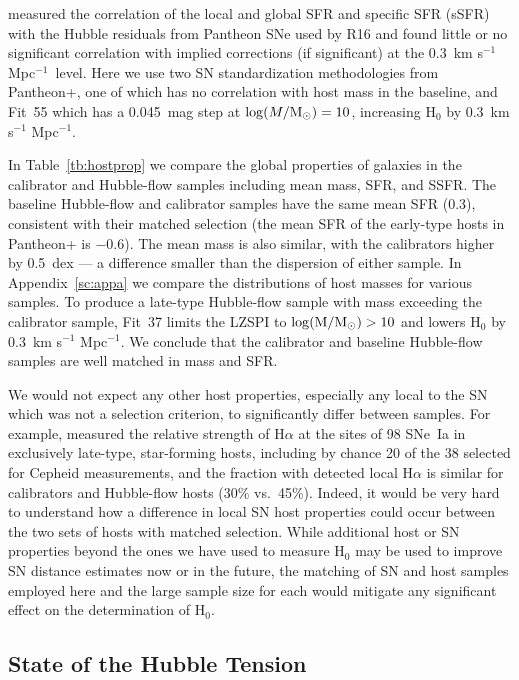 \documentclass[12pt]{aastex631}
\newcommand{\kms}{km s$^{-1}$ Mpc$^{-1}$}
\newcommand{\kmss }{km s$^{-1}$ Mpc$^{-1}$\ }
\begin{document}
\citet{Jones:2018} measured the correlation of the local and global SFR and specific SFR (sSFR) with the Hubble residuals from Pantheon SNe \citep{Scolnic:2018} used by R16 and found little or no significant correlation with implied corrections (if significant) at the 0.3~\kmss level. Here we use two SN standardization methodologies from Pantheon+, one of which has no correlation with host mass \citep{Brout:2021} in the baseline, and Fit~55 which has a 0.045~mag step at $\log (M/{\rm M}_\odot) = 10$, increasing H$_0$ by 0.3~\kms.  

In Table~\ref{tb:hostprop} we compare the global properties of galaxies in the calibrator and Hubble-flow samples including mean mass, SFR, and SSFR. The baseline Hubble-flow and calibrator samples have the same mean SFR (0.3), consistent with their matched selection (the mean SFR of the early-type hosts in Pantheon+ is $-0.6$).  The mean mass is also similar, with the calibrators higher by 0.5~dex --- a difference smaller than the dispersion of either sample.  In Appendix~\ref{sc:appa} we compare the distributions of host masses for various samples.  To produce a late-type Hubble-flow sample with mass exceeding the calibrator sample, Fit~37 limits the LZSPI to $\log (\rm M/{\rm M}_\odot) > 10$ and lowers H$_0$ by 0.3~\kms.  We conclude that the calibrator and baseline Hubble-flow samples are well matched in mass and SFR.

We would not expect any other host properties, especially any local to the SN which was not a selection criterion, to significantly differ between samples.  For example, \citet{Anderson:2015} measured the relative strength of H$\alpha$ at the sites of 98 SNe~Ia in exclusively late-type, star-forming hosts, including by chance 20 of the 38 selected for Cepheid measurements, and the fraction with detected local H$\alpha$ is similar for calibrators and Hubble-flow hosts (30\% vs.~45\%). Indeed, it would be very hard to understand how a difference in local SN host properties could occur between the two sets of hosts with matched selection. While additional host or SN properties beyond the ones we have used to measure H$_0$ may be used to improve SN distance estimates now or in the future, the matching of SN and host samples employed here and the large sample size for each would mitigate any significant effect on the determination of H$_0$.  

\subsection{State of the Hubble Tension\label{sc:7.4}}
\end{document}
